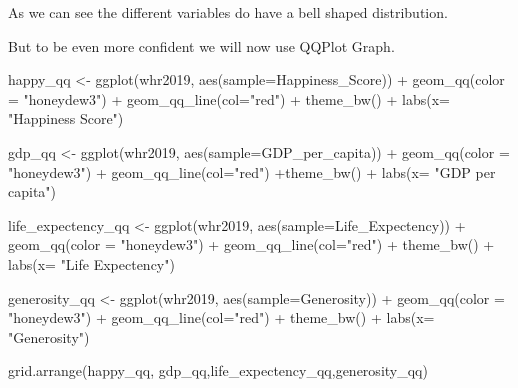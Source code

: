 \documentclass[
]{article}
\newenvironment{Shaded}{\begin{snugshade}}{\end{snugshade}}
\newcommand{\AttributeTok}[1]{\textcolor[rgb]{0.77,0.63,0.00}{#1}}
\newcommand{\FunctionTok}[1]{\textcolor[rgb]{0.00,0.00,0.00}{#1}}
\newcommand{\NormalTok}[1]{#1}
\newcommand{\OtherTok}[1]{\textcolor[rgb]{0.56,0.35,0.01}{#1}}
\newcommand{\SpecialCharTok}[1]{\textcolor[rgb]{0.00,0.00,0.00}{#1}}
\newcommand{\StringTok}[1]{\textcolor[rgb]{0.31,0.60,0.02}{#1}}
\begin{document}
As we can see the different variables do have a bell shaped
distribution.

But to be even more confident we will now use QQPlot Graph.

\begin{Shaded}
\begin{Highlighting}[]
\NormalTok{happy\_qq }\OtherTok{\textless{}{-}} \FunctionTok{ggplot}\NormalTok{(whr2019, }\FunctionTok{aes}\NormalTok{(}\AttributeTok{sample=}\NormalTok{Happiness\_Score)) }\SpecialCharTok{+}
  \FunctionTok{geom\_qq}\NormalTok{(}\AttributeTok{color =} \StringTok{"honeydew3"}\NormalTok{) }\SpecialCharTok{+} \FunctionTok{geom\_qq\_line}\NormalTok{(}\AttributeTok{col=}\StringTok{"red"}\NormalTok{) }\SpecialCharTok{+} \FunctionTok{theme\_bw}\NormalTok{() }\SpecialCharTok{+}
    \FunctionTok{labs}\NormalTok{(}\AttributeTok{x=} \StringTok{"Happiness Score"}\NormalTok{) }

\NormalTok{gdp\_qq }\OtherTok{\textless{}{-}} \FunctionTok{ggplot}\NormalTok{(whr2019, }\FunctionTok{aes}\NormalTok{(}\AttributeTok{sample=}\NormalTok{GDP\_per\_capita)) }\SpecialCharTok{+}
  \FunctionTok{geom\_qq}\NormalTok{(}\AttributeTok{color =} \StringTok{"honeydew3"}\NormalTok{) }\SpecialCharTok{+} \FunctionTok{geom\_qq\_line}\NormalTok{(}\AttributeTok{col=}\StringTok{"red"}\NormalTok{) }\SpecialCharTok{+}\FunctionTok{theme\_bw}\NormalTok{() }\SpecialCharTok{+}
    \FunctionTok{labs}\NormalTok{(}\AttributeTok{x=} \StringTok{"GDP per capita"}\NormalTok{)}

\NormalTok{life\_expectency\_qq }\OtherTok{\textless{}{-}} \FunctionTok{ggplot}\NormalTok{(whr2019, }\FunctionTok{aes}\NormalTok{(}\AttributeTok{sample=}\NormalTok{Life\_Expectency)) }\SpecialCharTok{+}
  \FunctionTok{geom\_qq}\NormalTok{(}\AttributeTok{color =} \StringTok{"honeydew3"}\NormalTok{) }\SpecialCharTok{+} \FunctionTok{geom\_qq\_line}\NormalTok{(}\AttributeTok{col=}\StringTok{"red"}\NormalTok{) }\SpecialCharTok{+} \FunctionTok{theme\_bw}\NormalTok{() }\SpecialCharTok{+}
    \FunctionTok{labs}\NormalTok{(}\AttributeTok{x=} \StringTok{"Life Expectency"}\NormalTok{)}

\NormalTok{generosity\_qq }\OtherTok{\textless{}{-}} \FunctionTok{ggplot}\NormalTok{(whr2019, }\FunctionTok{aes}\NormalTok{(}\AttributeTok{sample=}\NormalTok{Generosity)) }\SpecialCharTok{+}
  \FunctionTok{geom\_qq}\NormalTok{(}\AttributeTok{color =} \StringTok{"honeydew3"}\NormalTok{) }\SpecialCharTok{+} \FunctionTok{geom\_qq\_line}\NormalTok{(}\AttributeTok{col=}\StringTok{"red"}\NormalTok{) }\SpecialCharTok{+} \FunctionTok{theme\_bw}\NormalTok{() }\SpecialCharTok{+}
    \FunctionTok{labs}\NormalTok{(}\AttributeTok{x=} \StringTok{"Generosity"}\NormalTok{)}

\FunctionTok{grid.arrange}\NormalTok{(happy\_qq, gdp\_qq,life\_expectency\_qq,generosity\_qq)}
\end{Highlighting}
\end{Shaded}
\end{document}
